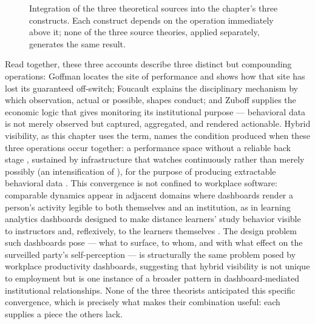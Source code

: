 \documentclass[10pt]{article}
\begin{document}
\begin{figure}[h]
\centering
{}
\caption{Integration of the three theoretical sources into the chapter's three constructs. Each construct depends on the operation immediately above it; none of the three source theories, applied separately, generates the same result.}
\label{fig:synthesis}
\end{figure}

Read together, these three accounts describe three distinct but compounding operations: Goffman locates the site of performance and shows how that site has lost its guaranteed off-switch; Foucault explains the disciplinary mechanism by which observation, actual or possible, shapes conduct; and Zuboff supplies the economic logic that gives monitoring its institutional purpose --- behavioral data is not merely observed but captured, aggregated, and rendered actionable. Hybrid visibility, as this chapter uses the term, names the condition produced when these three operations occur together: a performance space without a reliable back stage \cite{goffman}, sustained by infrastructure that watches continuously rather than merely possibly (an intensification of \cite{foucault}), for the purpose of producing extractable behavioral data \cite{zuboff}. This convergence is not confined to workplace software: comparable dynamics appear in adjacent domains where dashboards render a person's activity legible to both themselves and an institution, as in learning analytics dashboards designed to make distance learners' study behavior visible to instructors and, reflexively, to the learners themselves \cite{rets}. The design problem such dashboards pose --- what to surface, to whom, and with what effect on the surveilled party's self-perception --- is structurally the same problem posed by workplace productivity dashboards, suggesting that hybrid visibility is not unique to employment but is one instance of a broader pattern in dashboard-mediated institutional relationships. None of the three theorists anticipated this specific convergence, which is precisely what makes their combination useful: each supplies a piece the others lack.
\end{document}
